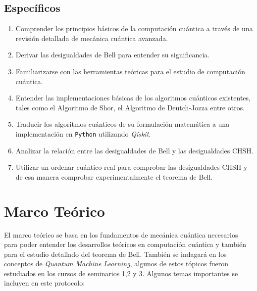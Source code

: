 \documentclass[a4paper]{article}
\begin{document}
\subsection{Específicos}
\begin{enumerate}
\item Comprender los principios básicos de la computación cuántica a través de una revisión detallada de mecánica cuántica avanzada.
\item Derivar las desigualdades de Bell para entender su significancia.
\item Familiarizarse con las herramientas teóricas para el estudio de computación cuántica.
\item Entender las implementaciones básicas de los algoritmos cuánticos existentes, tales como el Algoritmo de Shor, el Algoritmo de Deutch-Jozza entre otros.
\item Traducir los algoritmos cuánticos de su formulación matemática a una implementación en \texttt{Python} utilizando \textit{Qiskit}.
\item Analizar la relación entre las desigualdades de Bell y las desigualdades CHSH.
\item Utilizar un ordenar cuántico real para comprobar las desigualdades CHSH y de esa manera comprobar experimentalmente el teorema de Bell.

\end{enumerate}
\section{Marco Teórico}
El marco teórico se basa en los fundamentos de mecánica cuántica necesarios para poder entender los desarrollos teóricos en computación cuántica y también para el estudio detallado del teorema de Bell\cite{Bell}. También se indagará en los conceptos de \textit{Quantum Machine Learning}, algunos de estos tópicos fueron estudiados en los cursos de seminarios 1,2 y 3. Algunos temas importantes se incluyen en este protocolo:
\end{document}
